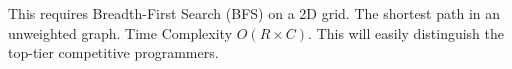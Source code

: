 This requires Breadth-First Search (BFS) on a 2D grid. The shortest path in an unweighted graph. Time Complexity $O(R \times C)$. This will easily distinguish the top-tier competitive programmers.